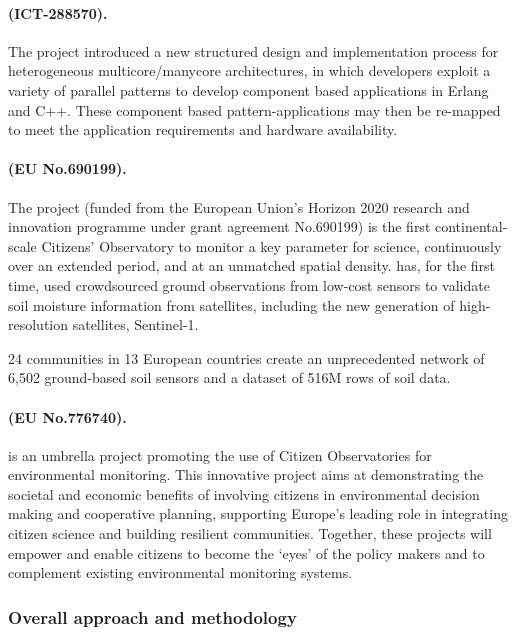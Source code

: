 \documentclass[a4paper,11pt]{article}
\begin{document}
\vspace{-2pt}
\paragraph{\paraphrase (ICT-288570).}
The \paraphrase project introduced a new structured design and implementation process for
heterogeneous multicore/manycore architectures, in which developers exploit a variety of
parallel patterns to develop component based applications in Erlang and C++. These
component based pattern-applications may then be re-mapped to meet the
application requirements and hardware availability. 
\vspace{-2pt}
\paragraph{\grow (EU No.690199).}
The \grow project (funded from the European Union’s Horizon 2020 research and innovation programme under grant agreement No.690199) is the first continental-scale Citizens’ Observatory to monitor a key parameter for science, continuously over an extended period, and at an unmatched spatial density. \grow has, for the first time, used crowdsourced ground observations from low-cost sensors to validate soil moisture information from satellites, including the new generation of high-resolution satellites, Sentinel-1.

24 \grow communities in 13 European countries create an unprecedented network of 6,502 ground-based soil sensors and a dataset of 516M rows of soil data. 

\paragraph{\weobserve (EU No.776740).}
\weobserve is an umbrella project promoting the use of Citizen Observatories for environmental monitoring.  This innovative project aims at demonstrating the societal and economic benefits of involving citizens in environmental decision making and cooperative planning, supporting Europe’s leading role in integrating citizen science and building resilient communities. Together, these projects will empower and enable citizens to become the ‘eyes’ of the policy makers and to complement existing environmental monitoring systems.

\subsubsection{Overall approach and methodology}
\end{document}
